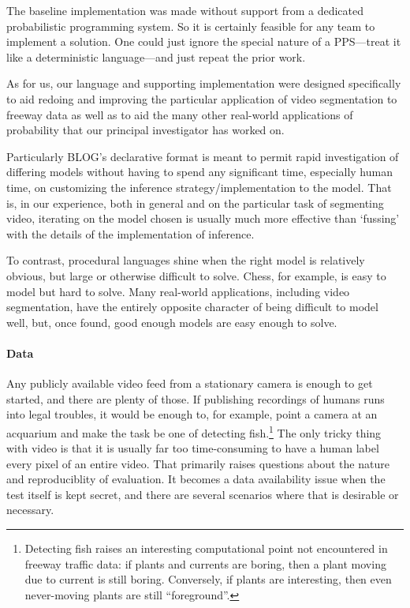 
The baseline implementation was made without support from a dedicated
probabilistic programming system.  So it is certainly feasible for any
team to implement a solution.  One could just ignore the special
nature of a PPS---treat it like a deterministic language---and just repeat
the prior work.

As for us, our language and supporting implementation were designed specifically
to aid redoing and improving the particular application of video segmentation to
freeway data as well as to aid the many other real-world
applications of probability that our principal investigator has worked
on.

Particularly BLOG's declarative format 
is meant to permit rapid investigation of differing models without
having to spend any significant time, especially human time, on
customizing the inference strategy/implementation to the model.  That
is, in our experience, both in general and on the particular task of
segmenting video, iterating on the model chosen is usually much more
effective than `fussing' with the details of the implementation of
inference. 

To contrast, procedural languages
shine when the right model is relatively obvious, but large or
otherwise difficult to solve. Chess, for example, is easy to model but hard to
solve.  Many real-world applications, including video segmentation,
have the entirely opposite character of being difficult to model well,
but, once found, good enough models are easy enough to solve.


\paragraph{Data}
Any publicly available video feed from a stationary camera is enough
to get started, and there are plenty of those.  If publishing
recordings of humans runs into legal troubles, it would be enough to,
for example, point a camera at an acquarium and make the task be one
of detecting fish.\footnote{Detecting fish raises an interesting
  computational point
  not encountered in freeway traffic data: if plants and currents are
  boring, then 
  a plant moving due to 
  current is still boring.  Conversely, if plants are interesting,
  then even never-moving plants are still ``foreground''.}
The only tricky thing with video is that it is usually far too
time-consuming to have a human label every pixel of an entire video.
That primarily raises questions about the nature and reproduciblity of
evaluation.  It becomes a data availability issue when the test itself
is kept secret, and there are several scenarios where that is
desirable or necessary.



